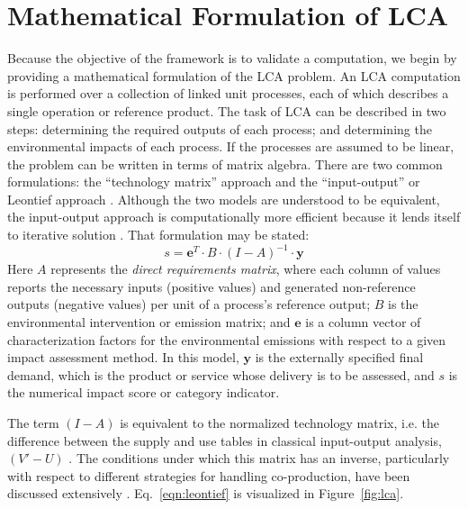 \section{Mathematical Formulation of LCA}

Because the objective of the framework is to validate a computation, we begin by providing a mathematical formulation of the LCA problem.  An LCA computation is performed over a collection of linked unit processes, each of which describes a single operation or reference product.  The task of LCA can be described in two steps: determining the required outputs of each process; and determining the environmental impacts of each process.  If the processes are assumed to be linear, the problem can be written in terms of matrix algebra.  There are two common formulations: the ``technology matrix'' approach and the ``input-output'' or Leontief approach \citep{Suh_2002, Pauliuk_2015}.  Although the two models are understood to be equivalent, the input-output approach is computationally more efficient because it lends itself to iterative solution \citep{Peters_2007}.  That formulation may be stated:
\begin{equation}
s = \mathbf{e}^T \cdot B \cdot \left(I - A\right)^{-1} \cdot \mathbf{y}
\label{eqn:leontief}
\end{equation}
Here $A$ represents the \emph{direct requirements matrix}, where each column of values reports the necessary inputs (positive values) and generated non-reference outputs (negative values) per unit of a process's reference output; $B$ is the environmental intervention or emission matrix; and $\mathbf{e}$ is a column vector of characterization factors for the environmental emissions with respect to a given impact assessment method.  In this model, $\mathbf{y}$ is the externally specified final demand, which is the product or service whose delivery is to be assessed, and $s$ is the numerical impact score or category indicator.  

The term $(I-A)$ is equivalent to the normalized technology matrix, i.e. the difference between the supply and use tables in classical input-output analysis, $(V'-U)$ \citep{Suh_2010}.  The conditions under which this matrix has an inverse, particularly with respect to different strategies for handling co-production, have been discussed extensively \citep{Suh_2010, Majeau_Bettez_2014}.  Eq.~\ref{eqn:leontief} is visualized in Figure~\ref{fig:lca}. 


